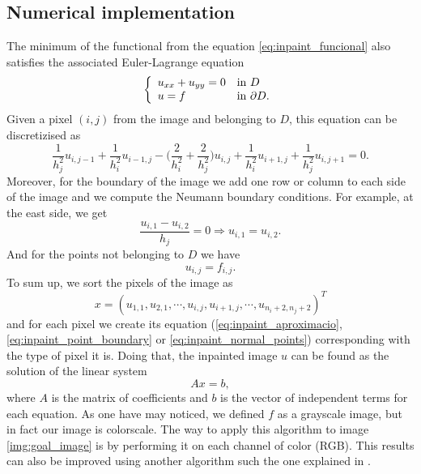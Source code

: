 \documentclass[10pt,a4paper]{llncs}
\begin{document}
\subsection{Numerical implementation}
The minimum of the functional from the equation \ref{eq:inpaint_funcional} also satisfies the associated Euler-Lagrange equation
\begin{equation}
\left\lbrace
\begin{array}{l l}

u_{xx}+u_{yy} = 0& \text{in }D \\
u = f & \text{in }\partial D.

\end{array}\right.
\label{eq:inpaint_E-L}
\end{equation}
Given a pixel $(i, j)$ from the image and belonging to $D$, this equation can be discretizised as \cite{hoffman2001numerical} \cite{Note1}
\begin{equation}
\frac{1}{h_j^2}u_{i,j-1} + \frac{1}{h_i^2}u_{i-1, j} - \bigg(\frac{2}{h_i^2}+\frac{2}{h_j^2}\bigg)u_{i,j} + \frac{1}{h_i^2}u_{i+1,j} + \frac{1}{h_j^2}u_{i, j+1} = 0.
\label{eq:inpaint_aproximacio}
\end{equation}
Moreover, for the boundary of the image we add one row or column to each side of the image and we compute the Neumann boundary conditions. For example, at the east side, we get
\begin{equation}
\frac{u_{i, 1} - u_{i, 2}}{h_j} = 0\Longrightarrow u_{i,1} = u_{i, 2}.
\label{eq:inpaint_point_boundary}
\end{equation}
And for the points not belonging to $D$ we have
\begin{equation}
u_{i, j} = f_{i, j}.
\label{eq:inpaint_normal_points}
\end{equation}
To sum up, we sort the pixels of the image as
\begin{equation}
x = (u_{1,1}, u_{2,1}, \cdots, u_{i, j}, u_{i+1, j}, \cdots ,u_{n_i + 2,n_j + 2})^T
\end{equation}
and for each pixel we create its equation (\ref{eq:inpaint_aproximacio}, \ref{eq:inpaint_point_boundary} or \ref{eq:inpaint_normal_points}) corresponding with the type of pixel it is. Doing that, the inpainted image $u$ can be found as the solution of the linear system 
\begin{equation}
Ax = b,
\end{equation}
where $A$ is the matrix of coefficients and $b$ is the vector of independent terms for each equation. As one have may noticed, we defined $f$ as a grayscale image, but in fact our image is colorscale. The way to apply this algorithm to image \ref{img:goal_image} is by performing it on each channel of color (RGB). This results can also be improved using another algorithm such the one explained in \cite{bresson2008fast}.
\end{document}
